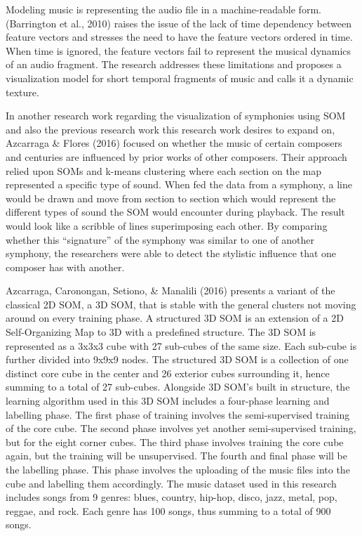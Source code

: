 Modeling music is representing the audio file in a machine-readable form. (Barrington et al., 2010) raises the issue of the lack of time dependency between feature vectors and stresses the need to have the feature vectors ordered in time. When time is ignored, the feature vectors fail to represent the musical dynamics of an audio fragment. The research addresses these limitations and proposes a visualization model for short temporal fragments of music and calls it a dynamic texture.

In another research work regarding the visualization of symphonies using SOM and also the previous research work this research work desires to expand on, Azcarraga \& Flores (2016) focused on whether the music of certain composers and centuries are influenced by prior works of other composers. Their approach relied upon SOMs and k-means clustering where each section on the map represented a specific type of sound. When fed the data from a symphony, a line would be drawn and move from section to section which would represent the different types of sound the SOM would encounter during playback. The result would look like a scribble of lines superimposing each other. By comparing whether this “signature” of the symphony was similar to one of another symphony, the researchers were able to detect the stylistic influence that one composer has with another.

	Azcarraga, Caronongan, Setiono, \& Manalili (2016) presents a variant of the classical 2D SOM, a 3D SOM, that is stable with the general clusters not moving around on every training phase. A structured 3D SOM is an extension of a 2D Self-Organizing Map to 3D with a predefined structure. The 3D SOM is represented as a 3x3x3 cube with 27 sub-cubes of the same size. Each sub-cube is further divided into 9x9x9 nodes. The structured 3D SOM is a collection of one distinct core cube in the center and 26 exterior cubes surrounding it, hence summing to a total of 27 sub-cubes. Alongside 3D SOM’s built in structure, the learning algorithm used in this 3D SOM includes a four-phase learning and labelling phase. The first phase of training involves the semi-supervised training of the core cube. The second phase involves yet another semi-supervised training, but for the eight corner cubes. The third phase involves training the core cube again, but the training will be unsupervised. The fourth and final phase will be the labelling phase. This phase involves the uploading of the music files into the cube and labelling them accordingly. The music dataset used in this research includes songs from 9 genres: blues, country, hip-hop, disco, jazz, metal, pop, reggae, and rock. Each genre has 100 songs, thus summing to a total of 900 songs.

